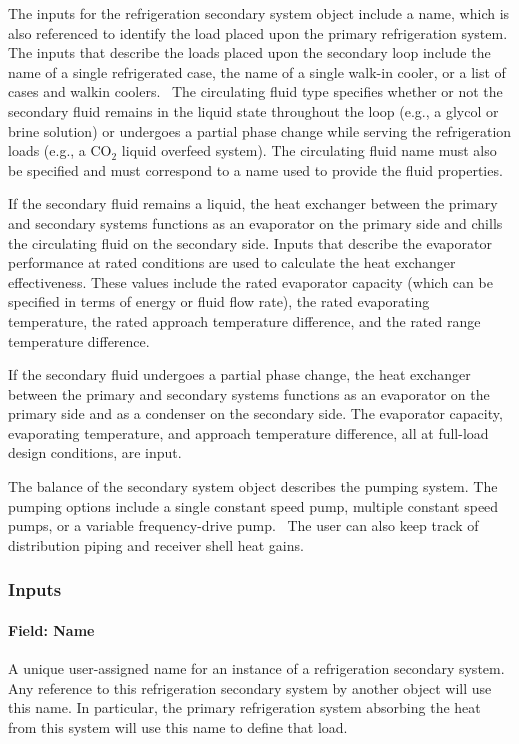 The inputs for the refrigeration secondary system object include a name, which is also referenced to identify the load placed upon the primary refrigeration system. The inputs that describe the loads placed upon the secondary loop include the name of a single refrigerated case, the name of a single walk-in cooler, or a list of cases and walkin coolers.~ The circulating fluid type specifies whether or not the secondary fluid remains in the liquid state throughout the loop (e.g., a glycol or brine solution) or undergoes a partial phase change while serving the refrigeration loads (e.g., a CO\(_{2}\) liquid overfeed system). The circulating fluid name must also be specified and must correspond to a name used to provide the fluid properties.

If the secondary fluid remains a liquid, the heat exchanger between the primary and secondary systems functions as an evaporator on the primary side and chills the circulating fluid on the secondary side. Inputs that describe the evaporator performance at rated conditions are used to calculate the heat exchanger effectiveness. These values include the rated evaporator capacity (which can be specified in terms of energy or fluid flow rate), the rated evaporating temperature, the rated approach temperature difference, and the rated range temperature difference.

If the secondary fluid undergoes a partial phase change, the heat exchanger between the primary and secondary systems functions as an evaporator on the primary side and as a condenser on the secondary side. The evaporator capacity, evaporating temperature, and approach temperature difference, all at full-load design conditions, are input.

The balance of the secondary system object describes the pumping system. The pumping options include a single constant speed pump, multiple constant speed pumps, or a variable frequency-drive pump.~ The user can also keep track of distribution piping and receiver shell heat gains.

\subsubsection{Inputs}\label{inputs-14-011}

\paragraph{Field: Name}\label{field-name-15-007}

A unique user-assigned name for an instance of a refrigeration secondary system. Any reference to this refrigeration secondary system by another object will use this name. In particular, the primary refrigeration system absorbing the heat from this system will use this name to define that load.


